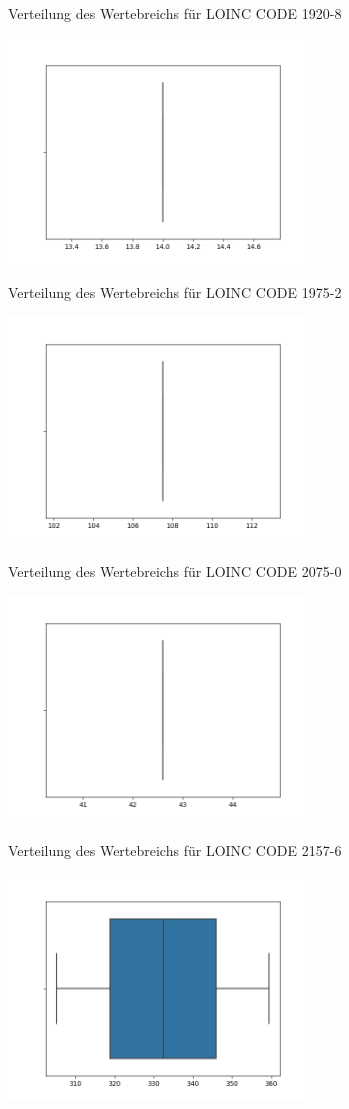 \documentclass[12pt,a4paper,toc=bibliographynumbered,toc=indenttextentries]{scrreprt}
\begin{document}
\begin{center}
			\small{Verteilung des Wertebreichs für LOINC CODE 1920-8}
			
			\includegraphics[width=8cm]{Graphs/1975-2.png}
			
			\small{Verteilung des Wertebreichs für LOINC CODE 1975-2}
			
			\includegraphics[width=8cm]{Graphs/2075-0.png}
			
			\small{Verteilung des Wertebreichs für LOINC CODE 2075-0}
			
			\includegraphics[width=8cm]{Graphs/2157-6.png}
			
			\small{Verteilung des Wertebreichs für LOINC CODE 2157-6}
			
			\includegraphics[width=8cm]{Graphs/2276-4.png}
			

\end{center}
\end{document}
